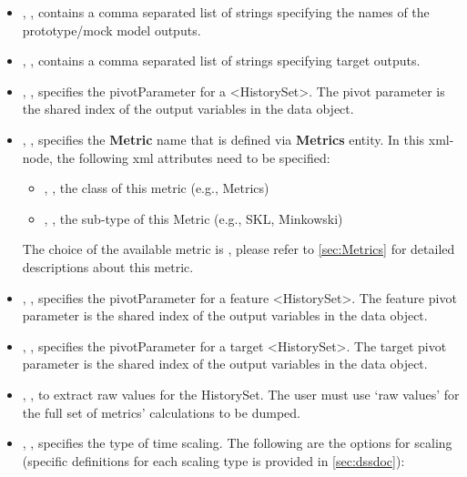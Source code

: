 \begin{itemize}
  \item {}, , contains a comma separated list of strings specifying the names of the prototype/mock model outputs.
  \item {}, , contains a comma separated list of
   strings specifying target outputs.
  \item {}, , specifies the pivotParameter for a <HistorySet>.
    The pivot parameter is the shared index of the output variables in the data object.
  \item {}, , specifies the \textbf{Metric} name that is defined via
    \textbf{Metrics} entity. In this xml-node, the following xml attributes need to be specified:
    \begin{itemize}
      \item {}, , the class of this metric (e.g., Metrics)
      \item {}, , the sub-type of this Metric (e.g., SKL, Minkowski)
    \end{itemize}
    \nb The choice of the available metric is , please
    refer to \ref{sec:Metrics} for detailed descriptions about this metric.
    \item {}, , specifies the pivotParameter for a feature <HistorySet>. The feature pivot parameter is the shared index of the output variables in the data object.
    \item {}, , specifies the pivotParameter for a target <HistorySet>. The target pivot parameter is the shared index of the output variables in the data object.
    \item {}, , to extract raw values for the HistorySet. The user must use ‘raw values’ for the full set of metrics’ calculations to be dumped.
    \item {}, , specifies the type of time scaling. The following are the options for scaling (specific definitions for each scaling type is provided in \ref{sec:dssdoc}):
      \begin{itemize}

\end{itemize}
\end{itemize}
